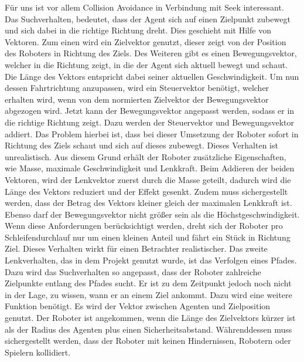 Für uns ist vor allem Collision Avoidance in Verbindung mit Seek interessant.
Das Suchverhalten, bedeutet, dass der Agent sich auf einen Zielpunkt zubewegt und sich dabei in die richtige Richtung dreht. Dies geschieht mit Hilfe von Vektoren. Zum einen wird ein Zielvektor genutzt, dieser zeigt von der Position des Roboters in Richtung des Ziels. Des Weiteren gibt es einen Bewegungsvektor, welcher in die Richtung zeigt, in die der Agent sich aktuell bewegt und schaut. Die Länge des Vektors entspricht dabei seiner aktuellen Geschwindigkeit. Um nun dessen Fahrtrichtung anzupassen, wird ein Steuervektor benötigt, welcher erhalten wird, wenn von dem normierten Zielvektor der Bewegungsvektor abgezogen wird. Jetzt kann der Bewegungsvektor angepasst werden, sodass er in die richtige Richtung zeigt. Dazu werden der Steuervektor und Bewegungsvektor addiert. Das Problem hierbei ist, dass bei dieser Umsetzung der Roboter sofort in Richtung des Ziels schaut und sich auf dieses zubewegt. Dieses Verhalten ist unrealistisch. Aus diesem Grund erhält der Roboter zusätzliche Eigenschaften, wie Masse, maximale Geschwindigkeit und Lenkkraft. Beim Addieren der beiden Vektoren, wird der Lenkvektor zuerst durch die Masse geteilt, dadurch wird die Länge des Vektors reduziert und der Effekt gesenkt. Zudem muss sichergestellt werden, dass der Betrag des Vektors kleiner gleich der maximalen Lenkkraft ist. Ebenso darf der Bewegungsvektor nicht größer sein als die Höchstgeschwindigkeit. Wenn diese Anforderungen berücksichtigt werden, dreht sich der Roboter pro Schleifendurchlauf nur um einen kleinen Anteil und fährt ein Stück in Richtung Ziel. Dieses Verhalten wirkt für einen Betrachter realistischer. 
Das zweite Lenkverhalten, das in dem Projekt genutzt wurde, ist das Verfolgen eines Pfades. Dazu wird das Suchverhalten so angepasst, dass der Roboter zahlreiche Zielpunkte entlang des Pfades sucht. Er ist zu dem Zeitpunkt jedoch noch nicht in der Lage, zu wissen, wann er an einem Ziel ankommt. Dazu wird eine weitere Funktion benötigt. Es wird der Vektor zwischen Agenten und Zielposition genutzt. Der Roboter ist angekommen, wenn die Länge des Zielvektors kürzer ist als der Radius des Agenten plus einen Sicherheitsabstand. Währenddessen muss sichergestellt werden, dass der Roboter mit keinen Hindernissen, Robotern oder Spielern kollidiert. 
